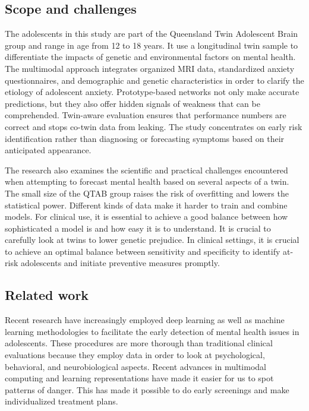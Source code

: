 \documentclass[10pt,letterpaper]{article}
\begin{document}
        \subsection*{Scope and challenges}
        The adolescents in this study are part of the Queensland Twin Adolescent Brain group and range in age from 12 to 18 years. It use a longitudinal twin sample to differentiate the impacts of genetic and environmental factors on mental health. The multimodal approach integrates organized MRI data, standardized anxiety questionnaires, and demographic and genetic characteristics in order to clarify the etiology of adolescent anxiety. Prototype-based networks not only make accurate predictions, but they also offer hidden signals of weakness that can be comprehended. Twin-aware evaluation ensures that performance numbers are correct and stops co-twin data from leaking. The study concentrates on early risk identification rather than diagnosing or forecasting symptoms based on their anticipated appearance.

        The research also examines the scientific and practical challenges encountered when attempting to forecast mental health based on several aspects of a twin. The small size of the QTAB group raises the risk of overfitting and lowers the statistical power. Different kinds of data make it harder to train and combine models. For clinical use, it is essential to achieve a good balance between how sophisticated a model is and how easy it is to understand. It is crucial to carefully look at twins to lower genetic prejudice. In clinical settings, it is crucial to achieve an optimal balance between sensitivity and specificity to identify at-risk adolescents and initiate preventive measures promptly.

        \subsection*{Related work}

        Recent research have increasingly employed deep learning as well as machine learning methodologies to facilitate the early detection of mental health issues in adolescents. These procedures are more thorough than traditional clinical evaluations because they employ data in order to look at psychological, behavioral, and neurobiological aspects. Recent advances in multimodal computing and learning representations have made it easier for us to spot patterns of danger. This has made it possible to do early screenings and make individualized treatment plans.
\end{document}
